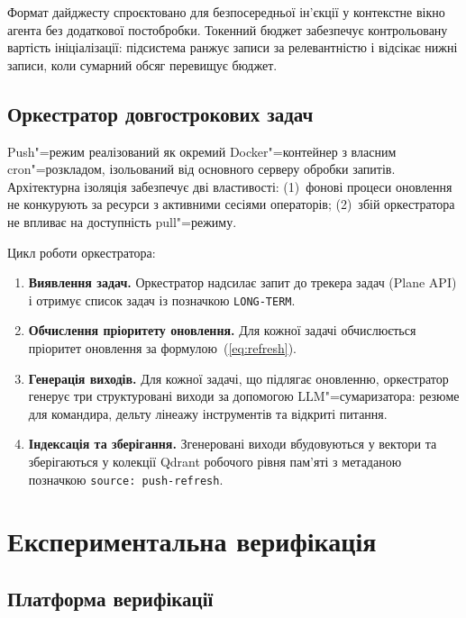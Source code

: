 \documentclass[11pt]{article}
\begin{document}
Формат дайджесту спроєктовано для безпосередньої ін'єкції у контекстне вікно агента без додаткової постобробки.
Токенний бюджет забезпечує контрольовану вартість ініціалізації: підсистема ранжує записи за релевантністю і відсікає нижні записи, коли сумарний обсяг перевищує бюджет.

\subsection{Оркестратор довгострокових задач}
\label{sec:orchestrator}

Push"=режим реалізований як окремий Docker"=контейнер з власним cron"=розкладом, ізольований від основного серверу обробки запитів.
Архітектурна ізоляція забезпечує дві властивості: (1)~фонові процеси оновлення не конкурують за ресурси з активними сесіями операторів; (2)~збій оркестратора не впливає на доступність pull"=режиму.

Цикл роботи оркестратора:
\begin{enumerate}[nosep]
  \item \textbf{Виявлення задач.} Оркестратор надсилає запит до трекера задач (Plane API) і отримує список задач із позначкою \texttt{LONG-TERM}.
  \item \textbf{Обчислення пріоритету оновлення.} Для кожної задачі обчислюється пріоритет оновлення за формулою~(\ref{eq:refresh}).
  \item \textbf{Генерація виходів.} Для кожної задачі, що підлягає оновленню, оркестратор генерує три структуровані виходи за допомогою LLM"=сумаризатора: резюме для командира, дельту лінеажу інструментів та відкриті питання.
  \item \textbf{Індексація та зберігання.} Згенеровані виходи вбудовуються у вектори та зберігаються у колекції Qdrant робочого рівня пам'яті з метаданою позначкою \texttt{source:\,push-refresh}.
\end{enumerate}

\section{Експериментальна верифікація}
\label{sec:evaluation}

\subsection{Платформа верифікації}
\label{sec:platform}
\end{document}
